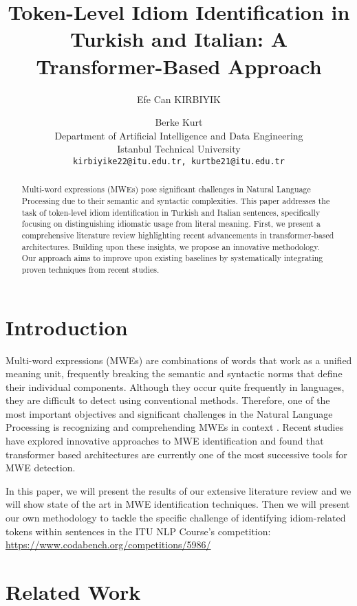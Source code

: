 \documentclass[11pt]{article}
\title{Token-Level Idiom Identification in Turkish and Italian: A Transformer-Based Approach}
\author{
Efe Can KIRBIYIK \and Berke Kurt \\
Department of Artificial Intelligence and Data Engineering \\
Istanbul Technical University \\
\texttt{kirbiyike22@itu.edu.tr,  kurtbe21@itu.edu.tr}
}
\begin{document}
\maketitle

\begin{abstract}
Multi-word expressions (MWEs) pose significant challenges in Natural Language Processing due to their semantic and syntactic complexities. This paper addresses the task of token-level idiom identification in Turkish and Italian sentences, specifically focusing on distinguishing idiomatic usage from literal meaning. First, we present a comprehensive literature review highlighting recent advancements in transformer-based architectures. Building upon these insights, we propose an innovative methodology. Our approach aims to improve upon existing baselines by systematically integrating proven techniques from recent studies.
\end{abstract}

\section{Introduction}

Multi-word expressions (MWEs) are combinations of words that work as a unified meaning unit, frequently breaking the semantic and syntactic norms that define their individual components. Although they occur quite frequently in languages, they are difficult to detect using conventional methods. Therefore, one of the most important objectives and significant challenges in the Natural Language Processing is recognizing and comprehending MWEs in context \citep{ID10M:2022}. Recent studies have explored innovative approaches to MWE identification and found that transformer based architectures are currently one of the most successive tools for MWE detection.

In this paper, we will present the results of our extensive literature review and we will show state of the art in MWE identification techniques. Then we will present our own methodology to tackle the specific challenge of identifying idiom-related tokens within sentences in the ITU NLP Course's competition:
\url{https://www.codabench.org/competitions/5986/}
\section{Related Work}
\end{document}

